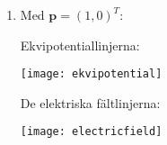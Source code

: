 \documentclass{article}
\renewcommand{\vec}[1]{\mathbf{#1}}
\begin{document}
\begin{enumerate}
\begin{comment}
			Har att

			$$ \nabla \phi = \sum_{i=1}^2 \left(\frac1{h_i} \frac{\partial \phi}{\partial u_i}\right) \vec e_i $$

			Får alltså att

			$$ \Phi(\vec r) = $$
			\end{comment}

			\filbreak

		\item
			Med $\vec p = \left(1, 0\right)^T$:

			\begin{samepage}
				Ekvipotentiallinjerna:
				\begin{center}
					\texttt{[image: ekvipotential]}
				\end{center}
			\end{samepage}

			\begin{samepage}
				De elektriska fältlinjerna:
				\begin{center}
					\texttt{[image: electricfield]}
				\end{center}
			\end{samepage}


\end{enumerate}
\end{document}
